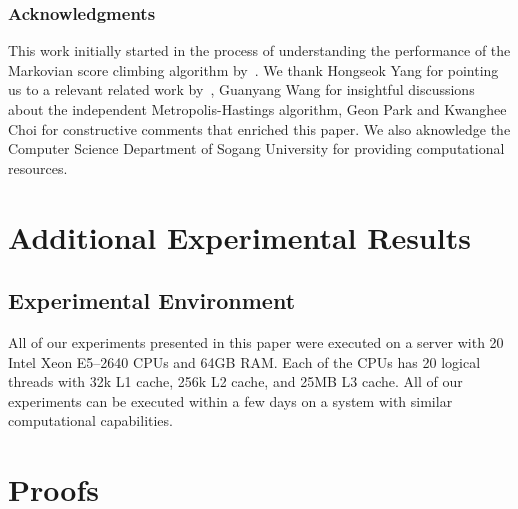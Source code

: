 \documentclass[twoside]{article} %
\begin{document}
%

%


\begin{abstract}
  
\end{abstract}








\subsubsection*{Acknowledgments}
  This work initially started in the process of understanding the performance of the Markovian score climbing algorithm by~\citet{NEURIPS2020_b2070693}.
  We thank Hongseok Yang for pointing us to a relevant related work by~\citet{kim2021adaptive}, Guanyang Wang for insightful discussions about the independent Metropolis-Hastings algorithm, Geon Park and Kwanghee Choi for constructive comments that enriched this paper.
  We also aknowledge the Computer Science Department of Sogang University for providing computational resources.



\newpage
\onecolumn
\appendix


\section{Additional Experimental Results}
\subsection{Experimental Environment}\label{section:resources}
All of our experiments presented in this paper were executed on a server with 20 Intel Xeon E5--2640 CPUs and 64GB RAM.
Each of the CPUs has 20 logical threads with 32k L1 cache, 256k L2 cache, and 25MB L3 cache.
All of our experiments can be executed within a few days on a system with similar computational capabilities.






\section{Proofs}
%
\printProofs
\end{document}
